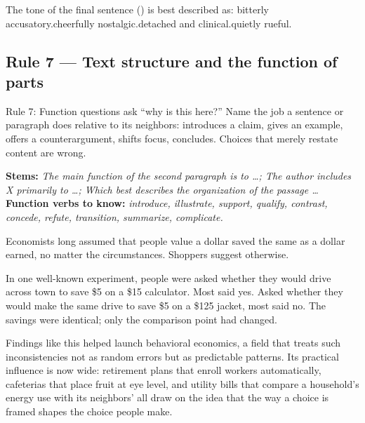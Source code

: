 \documentclass[11pt]{article}
\begin{document}
{The tone of the final sentence () is best described as:}
{bitterly accusatory.}{cheerfully nostalgic.}{detached and clinical.}{quietly rueful.}

\subsection{Rule 7 --- Text structure and the function of parts}
\begin{rulebox}{Rule 7: Function questions ask ``why is this here?''}
Name the job a sentence or paragraph does relative to its neighbors: introduces a claim, gives an example, offers a counterargument, shifts focus, concludes. Choices that merely restate content are wrong.
\end{rulebox}
\textbf{Stems:} \emph{The main function of the second paragraph is to \dots; The author includes X primarily to \dots; Which best describes the organization of the passage \dots}\\
\textbf{Function verbs to know:} \emph{introduce, illustrate, support, qualify, contrast, concede, refute, transition, summarize, complicate.}

\begin{passage}
Economists long assumed that people value a dollar saved the same as a dollar earned, no matter the circumstances. Shoppers suggest otherwise.

In one well-known experiment, people were asked whether they would drive across town to save \$5 on a \$15 calculator. Most said yes. Asked whether they would make the same drive to save \$5 on a \$125 jacket, most said no. The savings were identical; only the comparison point had changed.

Findings like this helped launch behavioral economics, a field that treats such inconsistencies not as random errors but as predictable patterns. Its practical influence is now wide: retirement plans that enroll workers automatically, cafeterias that place fruit at eye level, and utility bills that compare a household's energy use with its neighbors' all draw on the idea that the way a choice is framed shapes the choice people make.
\end{passage}
\end{document}
